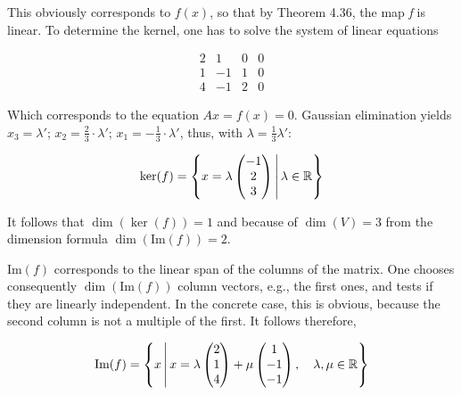 This obviously corresponds to \(f(x)\), so that by Theorem 4.36, the map \emph{f} is linear. To determine the kernel, one has to solve the system of linear equations

\[
    \begin{array}{cccc}
    2 & 1 & 0 & 0 \\
    1 & -1 & 1 & 0 \\
    4 & -1 & 2 & 0
    \end{array}
\]

Which corresponds to the equation \(Ax = f(x) = 0\). Gaussian 
elimination yields \(x_3 = \lambda'\); 
\(x_2 = \frac{2}{3} \cdot \lambda'\); \(x_1 = -\frac{1}{3} \cdot \lambda'\), 
thus, with \(\lambda = \frac{1}{3} \lambda'\):

\[
    \ker(f) =
    \left\{
    x = \lambda
    \begin{pmatrix}
    -1 \\
    2 \\
    3
    \end{pmatrix}
    \, \middle| \, \lambda \in \mathbb{R}
    \right\}
\]

It follows that \(\dim(\ker(f)) = 1\) and because of \(\dim(V) = 3\) from the dimension 
formula \(\dim(\text{Im}(f)) = 2\). 

\(\text{Im}(f)\) corresponds to the linear 
span of the columns of the matrix. One chooses consequently \(\dim(\text{Im}(f))\) 
column vectors, e.g., the first ones, and tests if they are linearly independent. 
In the concrete case, this is obvious, because the second column is 
not a multiple of the first. It follows therefore,

\[
    \text{Im}(f) =
    \left\{
    x \, \middle| \, x = \lambda
    \begin{pmatrix}
    2 \\
    1 \\
    4
    \end{pmatrix} + \mu
    \begin{pmatrix}
    1 \\
    -1 \\
    -1
    \end{pmatrix}
    , \quad \lambda, \mu \in \mathbb{R}
    \right\}
\]


